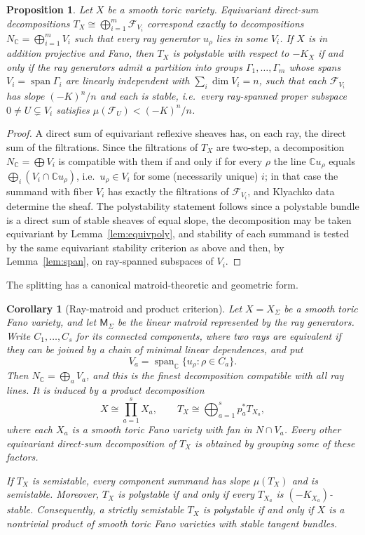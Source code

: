 \documentclass[11pt]{amsart}
\newtheorem{proposition}[theorem]{Proposition}
\newtheorem{corollary}[theorem]{Corollary}
\theoremstyle{definition}
\theoremstyle{remark}
\newcommand{\CC}{\mathbb{C}}
\begin{document}
\begin{proposition}\label{prop:split}
Let $X$ be a smooth toric variety. Equivariant direct-sum decompositions
$T_X \cong \bigoplus_{i=1}^m \mathcal{F}_{V_i}$ correspond exactly to
decompositions $N_\CC = \bigoplus_{i=1}^m V_i$ such that every ray
generator $u_\rho$ lies in some $V_i$. If $X$ is in addition projective and
Fano, then $T_X$ is polystable
with respect to $-K_X$ if and only if the ray generators admit a
partition into groups $\Gamma_1, \dots, \Gamma_m$ whose spans $V_i =
\operatorname{span} \Gamma_i$ are linearly independent with
$\sum_i \dim V_i = n$, such that each $\mathcal{F}_{V_i}$ has slope
$(-K)^n/n$ and each is stable, i.e.\ every ray-spanned proper subspace
$0 \neq U \subsetneq V_i$ satisfies
$\mu(\mathcal{F}_U) < (-K)^n/n$.
\end{proposition}

\begin{proof}
A direct sum of equivariant reflexive sheaves has, on each ray, the
direct sum of the filtrations. Since the filtrations of $T_X$ are
two-step, a decomposition $N_\CC = \bigoplus V_i$ is compatible with them
if and only if for every $\rho$ the line $\CC u_\rho$ equals
$\bigoplus_i (V_i \cap \CC u_\rho)$, i.e.\ $u_\rho \in V_i$ for some
(necessarily unique) $i$; in that case the summand with fiber $V_i$ has
exactly the filtrations of $\mathcal{F}_{V_i}$, and Klyachko data
determine the sheaf. The polystability statement follows since a
polystable bundle is a direct sum of stable sheaves of equal slope, the
decomposition may be taken equivariant by Lemma~\ref{lem:equivpoly}, and
stability of each summand is tested by the same equivariant stability
criterion as above and then, by Lemma~\ref{lem:span}, on ray-spanned
subspaces of $V_i$.
\end{proof}

The splitting has a canonical matroid-theoretic and geometric form.

\begin{corollary}[Ray-matroid and product criterion]\label{cor:matroidsplit}
Let $X=X_\Sigma$ be a smooth toric Fano variety, and let
$\mathsf M_\Sigma$ be the linear matroid represented by the ray generators.
Write $C_1,\dots,C_s$ for its connected components, where two rays are
equivalent if they can be joined by a chain of minimal linear dependences,
and put
\[
V_a=\operatorname{span}_\CC\{u_\rho:\rho\in C_a\}.
\]
Then $N_\CC=\bigoplus_aV_a$, and this is the finest decomposition compatible
with all ray lines. It is induced by a product decomposition
\[
X\cong\prod_{a=1}^sX_a,
\qquad
T_X\cong\bigoplus_{a=1}^s p_a^*T_{X_a},
\]
where each $X_a$ is a smooth toric Fano variety with fan in
$N\cap V_a$. Every other equivariant direct-sum decomposition of $T_X$ is
obtained by grouping some of these factors.

If $T_X$ is semistable, every component summand has slope $\mu(T_X)$ and is
semistable. Moreover, $T_X$ is polystable if and only if every $T_{X_a}$ is
$(-K_{X_a})$-stable. Consequently, a strictly semistable $T_X$ is polystable
if and only if $X$ is a nontrivial product of smooth toric Fano varieties
with stable tangent bundles.
\end{corollary}
\end{document}

